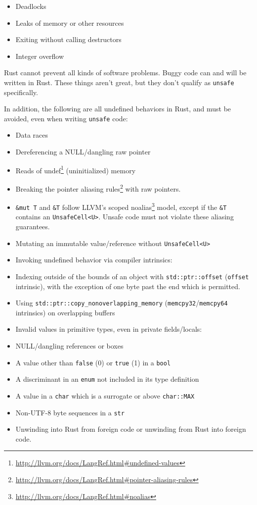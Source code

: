 \documentclass[a4paper,]{book}
\renewcommand{\href}[2]{#2\footnote{\url{#1}}}
\providecommand{\tightlist}{%
  \setlength{\itemsep}{0pt}\setlength{\parskip}{0pt}}
\begin{document}
\begin{itemize}
\tightlist
\item
  Deadlocks
\item
  Leaks of memory or other resources
\item
  Exiting without calling destructors
\item
  Integer overflow
\end{itemize}

Rust cannot prevent all kinds of software problems. Buggy code can and
will be written in Rust. These things aren't great, but they don't
qualify as \texttt{unsafe} specifically.

In addition, the following are all undefined behaviors in Rust, and must
be avoided, even when writing \texttt{unsafe} code:

\begin{itemize}
\tightlist
\item
  Data races
\item
  Dereferencing a NULL/dangling raw pointer
\item
  Reads of
  \href{http://llvm.org/docs/LangRef.html\#undefined-values}{undef}
  (uninitialized) memory
\item
  Breaking the
  \href{http://llvm.org/docs/LangRef.html\#pointer-aliasing-rules}{pointer
  aliasing rules} with raw pointers.
\item
  \texttt{\&mut\ T} and \texttt{\&T} follow LLVM's scoped
  \href{http://llvm.org/docs/LangRef.html\#noalias}{noalias} model,
  except if the \texttt{\&T} contains an
  \texttt{UnsafeCell\textless{}U\textgreater{}}. Unsafe code must not
  violate these aliasing guarantees.
\item
  Mutating an immutable value/reference without
  \texttt{UnsafeCell\textless{}U\textgreater{}}
\item
  Invoking undefined behavior via compiler intrinsics:
\item
  Indexing outside of the bounds of an object with
  \texttt{std::ptr::offset} (\texttt{offset} intrinsic), with the
  exception of one byte past the end which is permitted.
\item
  Using \texttt{std::ptr::copy\_nonoverlapping\_memory}
  (\texttt{memcpy32}/\texttt{memcpy64} intrinsics) on overlapping
  buffers
\item
  Invalid values in primitive types, even in private fields/locals:
\item
  NULL/dangling references or boxes
\item
  A value other than \texttt{false} (0) or \texttt{true} (1) in a
  \texttt{bool}
\item
  A discriminant in an \texttt{enum} not included in its type definition
\item
  A value in a \texttt{char} which is a surrogate or above
  \texttt{char::MAX}
\item
  Non-UTF-8 byte sequences in a \texttt{str}
\item
  Unwinding into Rust from foreign code or unwinding from Rust into
  foreign code.
\end{itemize}
\end{document}
